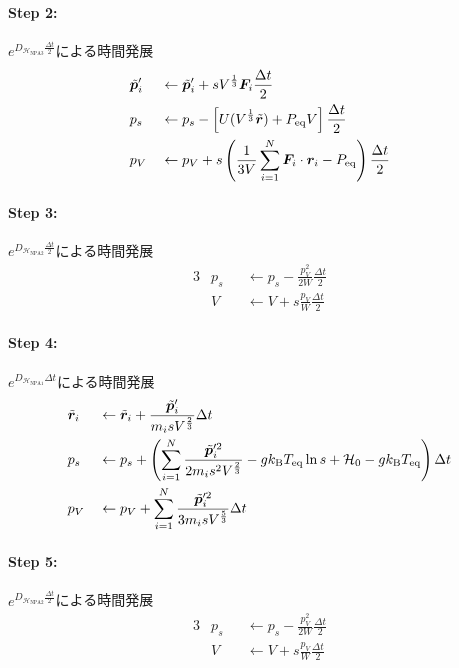 \paragraph{Step 2:}
$e^{D_{\mathcal{H}_{\mathrm{NPA}3}} \frac{\Delta t}{2}}$による時間発展
\begin{alignat}{3}
  & \Tilde{\bm{p}}_{i}^{\prime} && \gets
  \Tilde{\bm{p}}_{i}^{\prime}
  +
  s V^{\frac{1}{3}} \bm{F}_{i} \frac{\Delta t}{2}
  \\
  & p_{s} && \gets
  p_{s}
  -
  \left[
    U(V^{\frac{1}{3}} \Tilde{\bm{r}}) + P_{\mathrm{eq}}V
  \right] \frac{\Delta t}{2}
  \\
  & p_{V} && \gets
  p_{V}
  +
  s
  \left(
    \frac{1}{3V}
    \sum_{i=1}^{N} \bm{F}_{i} \cdot \bm{r}_{i}
    -
    P_{\mathrm{eq}}
  \right) \frac{\Delta t}{2}
\end{alignat}

\paragraph{Step 3:}
$e^{D_{\mathcal{H}_{\mathrm{NPA}2}} \frac{\Delta t}{2}}$による時間発展
\begin{alignat}{3}
  & p_{s} && \gets
  p_{s}
  -
  \frac{p_{V}^{2}}{2W} \frac{\Delta t}{2}
  \\
  & V && \gets
  V
  +
  s \frac{p_{V}}{W} \frac{\Delta t}{2}
\end{alignat}


\paragraph{Step 4:}
$e^{D_{\mathcal{H}_{\mathrm{NPA}1}} \Delta t}$による時間発展
\begin{alignat}{3}
  & \Tilde{\bm{r}}_{i} && \gets
  \Tilde{\bm{r}}_{i}
  +
  \frac{\Tilde{\bm{p}}_{i}^{\prime}}{m_{i}sV^{\frac{2}{3}}}
  \Delta t
  \\
  & p_{s} && \gets
  p_{s}
  +
  \left(
    \sum_{i=1}^{N}
    \frac{\Tilde{\bm{p}}_{i}^{\prime 2}}{2m_{i}s^{2}V^{\frac{2}{3}}}
    -
    g k_{\mathrm{B}} T_{\mathrm{eq}} \ln s
    +
    \mathcal{H}_{0}
    -
    g k_{\mathrm{B}} T_{\mathrm{eq}}
  \right) \Delta t
  \\
  & p_{V} && \gets
  p_{V}
  +
  \sum_{i=1}^{N}
  \frac{\Tilde{\bm{p}}_{i}^{\prime 2}}{3m_{i} s V^{\frac{5}{3}}}
  \Delta t
\end{alignat}


\paragraph{Step 5:}
$e^{D_{\mathcal{H}_{\mathrm{NPA}2}} \frac{\Delta t}{2}}$による時間発展
\begin{alignat}{3}
  & p_{s} && \gets
  p_{s}
  -
  \frac{p_{V}^{2}}{2W} \frac{\Delta t}{2}
  \\
  & V && \gets
  V
  +
  s \frac{p_{V}}{W} \frac{\Delta t}{2}
\end{alignat}

